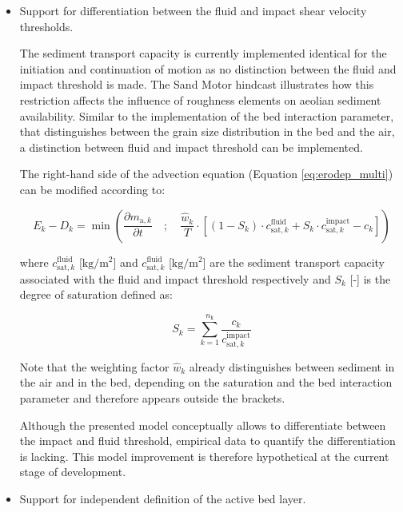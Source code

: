 \begin{itemize}
\item Support for differentiation between the fluid and impact shear
  velocity thresholds.

  The sediment transport capacity is currently implemented identical
  for the initiation and continuation of motion as no distinction
  between the fluid and impact threshold is made. The Sand Motor
  hindcast illustrates how this restriction affects the influence of
  roughness elements on aeolian sediment availability. Similar to the
  implementation of the bed interaction parameter, that distinguishes
  between the grain size distribution in the bed and the air, a
  distinction between fluid and impact threshold can be implemented.

  The right-hand side of the advection equation (Equation
  \ref{eq:erodep_multi}) can be modified according to:

  \begin{equation}
    \label{eq:erodep_split}
    E_k - D_k = \min \left( 
      \frac{\partial m_{\mathrm{a},k}}{\partial t} \quad ; \quad 
      \frac{\hat{w}_k}{T} \cdot \left[
        (1 - S_k) \cdot c^{\mathrm{fluid}}_{\mathrm{sat},k} +
        S_k \cdot c^{\mathrm{impact}}_{\mathrm{sat},k} - c_k
      \right]
    \right)
  \end{equation}

  \noindent where $c^{\mathrm{fluid}}_{\mathrm{sat},k}$
  [$\mathrm{kg/m^2}$] and $c^{\mathrm{fluid}}_{\mathrm{sat},k}$
  [$\mathrm{kg/m^2}$] are the sediment transport capacity associated
  with the fluid and impact threshold respectively and $S_k$ [-] is
  the degree of saturation defined as:

  \begin{equation}
    S_k = \sum_{k=1}^{n_{\mathrm{k}}} \frac{c_k}{c^{\mathrm{impact}}_{\mathrm{sat},k}}
  \end{equation}

  \noindent Note that the weighting factor $\hat{w}_k$ already
  distinguishes between sediment in the air and in the bed, depending
  on the saturation and the bed interaction parameter and therefore
  appears outside the brackets.

  Although the presented model conceptually allows to differentiate
  between the impact and fluid threshold, empirical data to quantify
  the differentiation is lacking. This model improvement is therefore
  hypothetical at the current stage of development.

\item Support for independent definition of the active bed layer.


\end{itemize}
